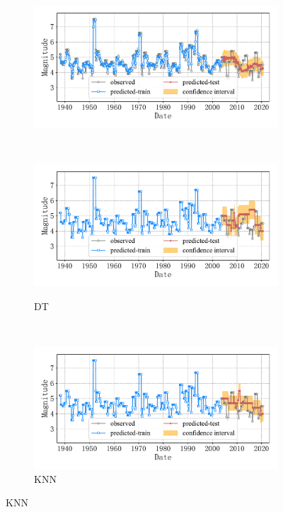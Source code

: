 \begin{figure}[!htbp]
\begin{subfigure}[b]{0.45\textwidth}
    \includegraphics[width=\textwidth]{Img/chap5_seism/block4/seism_gbr_minyear_1932_maxyear_2021_spanlat_2_spanlon_4_timewindow_72_nextmonth_12_minmag_3.0_block_4.pdf}
    \vspace{-1cm}
    \label{fig:seism_gbr_minyear_1932_maxyear_2021_spanlat_2_spanlon_4_timewindow_72_nextmonth_12_minmag_3.0_block_4}
  \end{subfigure}
  ~
  \begin{subfigure}[b]{0.45\textwidth}
    \caption{DT}
    \vspace{-0.2cm}
    \includegraphics[width=\textwidth]{Img/chap5_seism/block4/seism_dt_minyear_1932_maxyear_2021_spanlat_2_spanlon_4_timewindow_72_nextmonth_12_minmag_3.0_block_4.pdf}
    \vspace{-1cm}
    \label{fig:seism_dt_minyear_1932_maxyear_2021_spanlat_2_spanlon_4_timewindow_72_nextmonth_12_minmag_3.0_block_4}
  \end{subfigure}
  \\
  \begin{subfigure}[b]{0.45\textwidth}
    \caption{KNN}
    \vspace{-0.2cm}
    \includegraphics[width=\textwidth]{Img/chap5_seism/block4/seism_kn_minyear_1932_maxyear_2021_spanlat_2_spanlon_4_timewindow_72_nextmonth_12_minmag_3.0_block_4.pdf}

\end{subfigure}
\end{figure}
